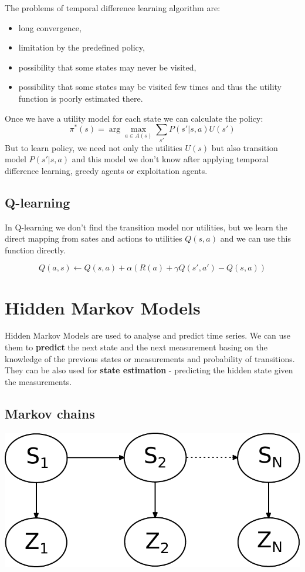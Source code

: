 \documentclass[a4paper,10pt]{article}
\begin{document}
The problems of temporal difference learning algorithm are:\begin{itemize}
\item long convergence,
\item limitation by the predefined policy,
\item possibility that some states may never be visited,
\item possibility that some states may be visited few times and thus the utility function is poorly estimated there.
\end{itemize}

Once we have a utility model for each state we can calculate the policy:
\[ \pi^*(s) = \arg\max_{a \in A(s)} \sum_{s'} P(s'|s,a) U(s') \]
But to learn policy, we need not only the utilities $U(s)$ but also transition model $P(s'|s,a)$ and this model we don't know after applying temporal difference learning, greedy agents or exploitation agents. 

\subsection{Q-learning}

In Q-learning we don't find the transition model nor utilities, but we learn the direct mapping from sates and actions to utilities $Q(s,a)$ and we can use this function directly.

\[ Q(a,s) \leftarrow Q(s,a) + \alpha \left( R(a) +\gamma Q(s',a') - Q(s,a) \right) \]

\section{Hidden Markov Models}

Hidden Markov Models are used to analyse and predict time series. We can use them to \textbf{predict} the next state and the next measurement basing on the knowledge of the previous states or measurements and probability of transitions. They can be also used for \textbf{state estimation} - predicting the hidden state given the measurements.

\subsection{Markov chains}

\begin{center}
\includegraphics[height=0.08\paperheight]{HMN.pdf}
\end{center}
\end{document}
